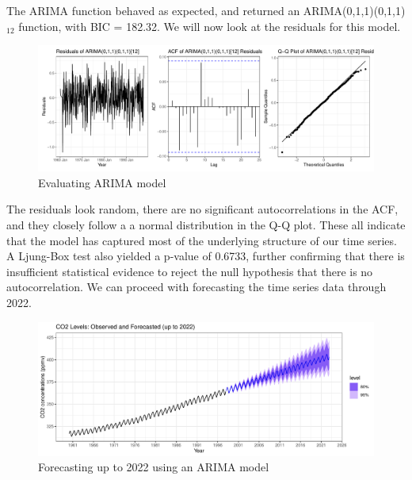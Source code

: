 \documentclass[
]{article}
\begin{document}
The ARIMA function behaved as expected, and returned an ARIMA(0,1,1)(0,1,1)\(_{12}\) function, with BIC = 182.32. We will now look at the residuals for this model.

\begin{figure}

{\centering \includegraphics[width=1\linewidth]{lab_prompt_Updated_files/figure-latex/arima-residuals-1} 

}

\caption{Evaluating ARIMA model }\label{fig:arima-residuals}
\end{figure}

The residuals look random, there are no significant autocorrelations in the ACF, and they closely follow a a normal distribution in the Q-Q plot. These all indicate that the model has captured most of the underlying structure of our time series. A Ljung-Box test also yielded a p-value of 0.6733, further confirming that there is insufficient statistical evidence to reject the null hypothesis that there is no autocorrelation. We can proceed with forecasting the time series data through 2022.
\newpage

\begin{figure}[H]

{\centering \includegraphics[width=1\linewidth]{lab_prompt_Updated_files/figure-latex/arima-forecasting-1} 

}

\caption{Forecasting up to 2022 using an ARIMA model}\label{fig:arima-forecasting}
\end{figure}
\end{document}
